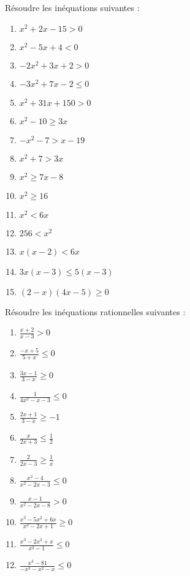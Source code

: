\begin{exercice}
Résoudre les inéquations suivantes :
\begin{multicols}{2}
\begin{enumerate}
\item ${{x}^{2}}+2x-15>0$ 
\item ${{x}^{2}}-5x+4<0$ 
\item $-2{{x}^{2}}+3x+2>0$ 
\item $-3{{x}^{2}}+7x-2\le 0$ 
\item $x{}^{2}+31x+150>0$ 
\item ${{x}^{2}}-10\ge 3x$
\item $-{{x}^{2}}-7>x-19$
\item ${{x}^{2}}+7>3x$
\item ${{x}^{2}}\ge 7x-8$
\item ${{x}^{2}}\ge 16$
\item ${{x}^{2}}<6x$
\item $256<{{x}^{2}}$
\item $x(x-2)<6x$
\item $3x(x-3)\le 5\left( x-3 \right)$
\item $\left( 2-x \right)\left( 4x-5 \right)\ge 0$
\end{enumerate}
\end{multicols}
\end{exercice}

\begin{exercice}
Résoudre les inéquations rationnelles suivantes :
\begin{multicols}{2}
\begin{enumerate}
\item $\frac{x+2}{x-3}>0$ 
\item $\frac{-x+5}{5+x}\le 0$ 
\item $\frac{3x-1}{3-x}\ge 0$ 
\item $\frac{1}{4{{x}^{2}}-x-3}\le 0$ 
\item $\frac{2x+1}{3-x}\ge -1$
\item $\frac{x}{2x+3}\le \frac{1}{2}$
\item $\frac{2}{2x-3}\ge \frac{1}{x}$
\item $\frac{{{x}^{2}}-4}{{{x}^{2}}-2x-3}\le 0$
\item $\frac{x-1}{{{x}^{2}}-2x-8}>0$
\item $\frac{{{x}^{3}}-5{{x}^{2}}+6x}{{{x}^{2}}-2x+1}\ge 0$
\item $\frac{{{x}^{3}}-2{{x}^{2}}+x}{{{x}^{2}}-1}\le 0$
\item $\frac{{{x}^{4}}-81}{-{{x}^{3}}-{{x}^{2}}-x}\le 0$
\end{enumerate}
\end{multicols}
\end{exercice}

